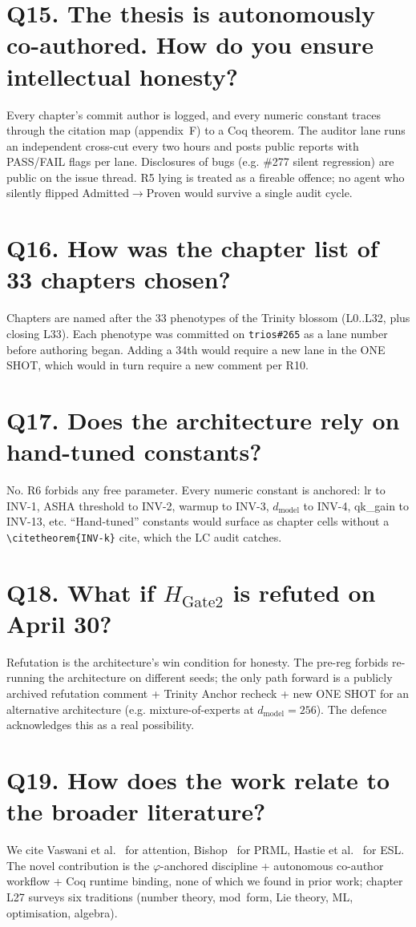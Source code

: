 \section*{Q15. The thesis is autonomously co-authored. How do you ensure intellectual honesty?}
Every chapter's commit author is logged, and every numeric constant traces
through the citation map (appendix~F) to a Coq theorem. The auditor lane
runs an independent cross-cut every two hours and posts public reports with
PASS/FAIL flags per lane. Disclosures of bugs (e.g. \#277 silent regression)
are public on the issue thread. R5 lying is treated as a fireable offence;
no agent who silently flipped Admitted$\to$Proven would survive a single
audit cycle.

\section*{Q16. How was the chapter list of 33 chapters chosen?}
Chapters are named after the 33 phenotypes of the Trinity blossom (L0..L32,
plus closing L33). Each phenotype was committed on \texttt{trios\#265} as a
lane number before authoring began. Adding a 34th would require a new lane
in the ONE SHOT, which would in turn require a new comment per R10.

\section*{Q17. Does the architecture rely on hand-tuned constants?}
No. R6 forbids any free parameter. Every numeric constant is anchored: lr to
INV-1, ASHA threshold to INV-2, warmup to INV-3, $d_{\mathrm{model}}$ to
INV-4, qk\_gain to INV-13, etc. ``Hand-tuned'' constants would surface as
chapter cells without a \texttt{\textbackslash citetheorem\{INV-k\}} cite,
which the LC audit catches.

\section*{Q18. What if $H_{\mathrm{Gate2}}$ is refuted on April 30?}
Refutation is the architecture's win condition for honesty. The pre-reg
forbids re-running the architecture on different seeds; the only path
forward is a publicly archived refutation comment + Trinity Anchor recheck +
new ONE SHOT for an alternative architecture (e.g. mixture-of-experts at
$d_{\mathrm{model}}\!=\!256$). The defence acknowledges this as a real
possibility.

\section*{Q19. How does the work relate to the broader literature?}
We cite Vaswani et al.~\cite{vaswani} for attention, Bishop~\cite{bishop} for
PRML, Hastie et al.~\cite{esl} for ESL. The novel contribution is the
$\varphi$-anchored discipline + autonomous co-author workflow + Coq runtime
binding, none of which we found in prior work; chapter L27 surveys six
traditions (number theory, mod\ form, Lie theory, ML, optimisation, algebra).


